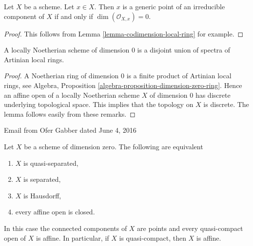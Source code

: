 \begin{lemma}
\label{lemma-generic-point}
Let $X$ be a scheme. Let $x \in X$. Then $x$ is a generic point of
an irreducible component of $X$ if and only if $\dim(\mathcal{O}_{X, x}) = 0$.
\end{lemma}

\begin{proof}
This follows from Lemma \ref{lemma-codimension-local-ring} for example.
\end{proof}

\begin{lemma}
\label{lemma-locally-Noetherian-dimension-0}
A locally Noetherian scheme of dimension $0$ is a disjoint
union of spectra of Artinian local rings.
\end{lemma}

\begin{proof}
A Noetherian ring of dimension $0$ is a finite product of Artinian local
rings, see
Algebra, Proposition \ref{algebra-proposition-dimension-zero-ring}.
Hence an affine open of a locally Noetherian scheme $X$ of dimension
$0$ has discrete underlying topological space. This implies that
the topology on $X$ is discrete. The lemma follows easily from these
remarks.
\end{proof}

\begin{lemma}
\label{lemma-dimension-zero}
\begin{reference}
Email from Ofer Gabber dated June 4, 2016
\end{reference}
Let $X$ be a scheme of dimension zero. The following are equivalent
\begin{enumerate}
\item $X$ is quasi-separated,
\item $X$ is separated,
\item $X$ is Hausdorff,
\item every affine open is closed.
\end{enumerate}
In this case the connected components of $X$ are points and every
quasi-compact open of $X$ is affine. In particular, if $X$
is quasi-compact, then $X$ is affine.
\end{lemma}

